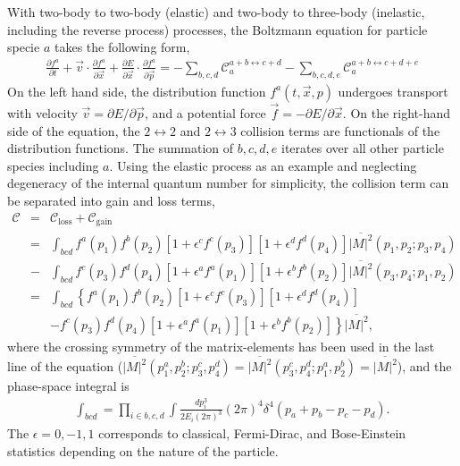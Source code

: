With two-body to two-body (elastic) and two-body to three-body (inelastic, including the reverse process) processes, the Boltzmann equation for particle specie $a$ takes the following form,
\begin{eqnarray}
\frac{\partial f^a}{\partial t} + \vec{v}\cdot\frac{\partial f^a}{\partial \vec{x}} + \frac{\partial E}{\partial \vec{x}}\cdot\frac{\partial f^{a}}{\partial \vec{p}} = - \sum_{b,c,d}\mathcal{C}_a^{a+b\leftrightarrow c+d}- \sum_{b,c,d,e}\mathcal{C}_a^{a+b\leftrightarrow c+d+e}
\end{eqnarray}
On the left hand side, the distribution function $f^{a}(t, \vec{x}, p)$ undergoes transport with velocity $\vec{v} = \partial E/\partial \vec{p}$, and a potential force $\vec{f} = -\partial E/\partial \vec{x}$.
On the right-hand side of the equation, the $2\leftrightarrow 2$ and $2\leftrightarrow 3$ collision terms are functionals of the distribution functions.
The summation of $b,c,d,e$ iterates over all other particle species including $a$.
Using the elastic process as an example and neglecting degeneracy of the internal quantum number for simplicity, the collision term can be separated into gain and loss terms,
\begin{eqnarray}
\mathcal{C} &=& \mathcal{C}_\textrm{loss} + \mathcal{C}_\textrm{gain}\\
&=& \int_{bcd} f^a(p_1)f^b(p_2)[1+\epsilon^c f^c(p_3)][1+\epsilon^d f^d(p_4)] \overline{|M|^2}(p_1, p_2; p_3, p_4) \\\nonumber
&-& \int_{bcd} f^c(p_3)f^d(p_4)[1+\epsilon^a f^a(p_1)][1+\epsilon^b f^b(p_2)] \overline{|M|^2}(p_3, p_4; p_1, p_2) \\
&=& \int_{bcd} \left\{
f^a(p_1)f^b(p_2)[1+\epsilon^c f^c(p_3)][1+\epsilon^d f^d(p_4)] \right. \label{eq:collision-term:symmetry} \\\nonumber
&& \left.- f^c(p_3)f^d(p_4)[1+\epsilon^a f^a(p_1)][1+\epsilon^b f^b(p_2)]\right\}
\overline{|M|^2},
\end{eqnarray}
where the crossing symmetry of the matrix-elements has been used in the last line of the equation ($\overline{|M|^2}(p_1^a, p_2^b; p_3^c, p_4^d) = \overline{|M|^2}(p_3^c, p_4^d; p_1^a, p_2^b) = \overline{|M|^2}$), and the phase-space integral is 
\begin{eqnarray}
\int_{bcd} = \prod_{i\in {b,c,d}}\int\frac{dp_i^3}{2E_i (2\pi)^3} (2\pi)^4 \delta^{4}(p_a+p_b - p_c-p_d).
\end{eqnarray}
The $\epsilon = 0, -1, 1$ corresponds to classical, Fermi-Dirac, and Bose-Einstein statistics depending on the nature of the particle.
